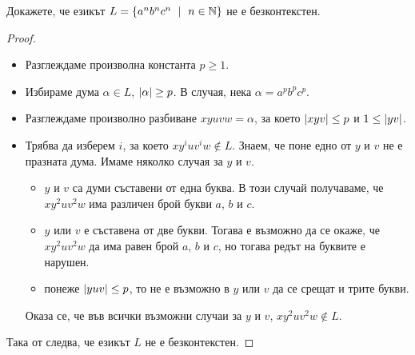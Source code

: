 \begin{problem}
  \label{pr:anbncn}
  Докажете, че езикът $L = \{a^nb^nc^n\ \mid\ n\in\mathbb{N}\}$ не е безконтекстен.
\end{problem}
\begin{proof}
  \begin{itemize}
  \item 
    Разглеждаме произволна константа $p \geq 1$.
  \item
    Избираме дума $\alpha \in L$, $\lvert{\alpha}\rvert \geq p$.
    В случая, нека $\alpha = a^pb^pc^p$.
  \item
    Разглеждаме произволно разбиване $xyuvw = \alpha$, за което $\lvert{xyv}\rvert \leq p$ и $1 \leq \lvert{yv}\rvert$.
  \item
    Трябва да изберем $i$, за което $xy^iuv^iw \not\in L$.
    Знаем, че поне едно от $y$ и $v$ не е празната дума.
    Имаме няколко случая за $y$ и $v$.
    \begin{itemize}
    \item
      $y$ и $v$ са думи съставени от една буква.
      В този случай получаваме, че $xy^2uv^2w$ има различен брой букви $a$, $b$ и $c$.
    \item
      $y$ или $v$ е съставена от две букви.
      Тогава е възможно да се окаже, че $xy^2uv^2w$ да има равен брой $a$, $b$ и $c$,
      но тогава редът на буквите е нарушен.
    \item
      понеже $\lvert{yuv}\rvert \leq p$, то не е възможно в $y$ или $v$ да се срещат и трите букви.
    \end{itemize}  
    Оказа се, че във всички възможни случаи за $y$ и $v$, 
    $xy^2uv^2w \not\in L$.
  \end{itemize}
  Така от  следва, че езикът $L$ не е безконтекстен.
\end{proof}


